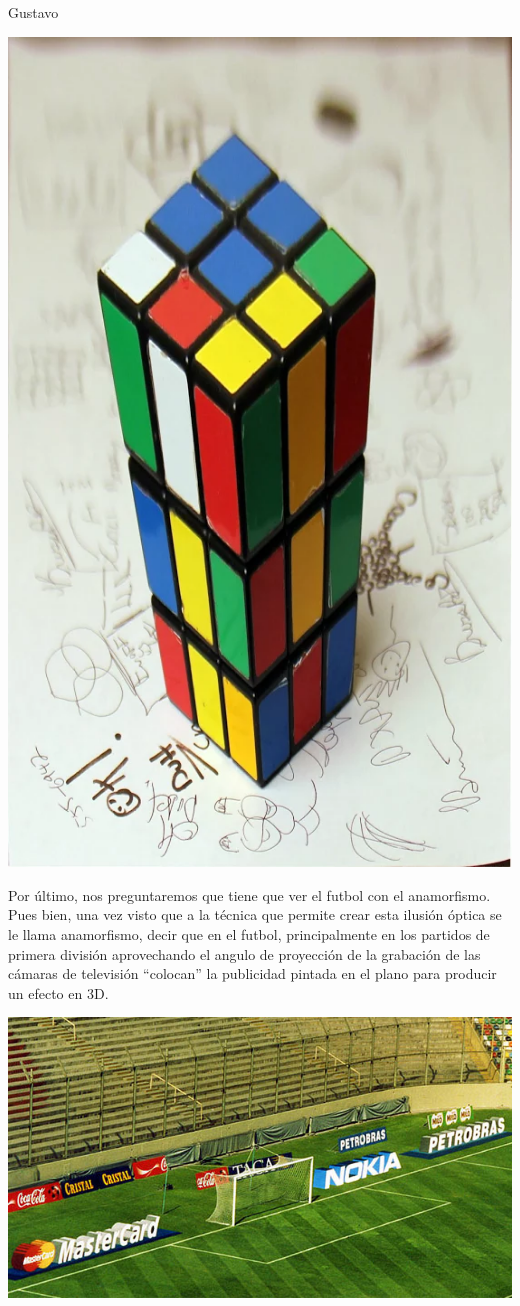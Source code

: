 \begin{opin}{\guscolor}{Gustavo}
\begin{minipage}[h]{1\linewidth}
	\centering
	\includegraphics[width=0.7\linewidth]{img/anamorf3.png}
\end{minipage}
 
Por último, nos preguntaremos que tiene que ver el futbol con el anamorfismo. Pues bien, una vez visto que a la técnica que permite crear esta ilusión óptica se le llama anamorfismo, decir que en el futbol, principalmente en los partidos de primera división aprovechando el angulo de proyección de la grabación de las cámaras de televisión “colocan” la publicidad pintada en el plano para producir un efecto en 3D.

\begin{minipage}[h]{1\linewidth}
	\centering
	\includegraphics[width=0.7\linewidth]{img/anamorf4.jpg}
\end{minipage}
 

\end{opin}
